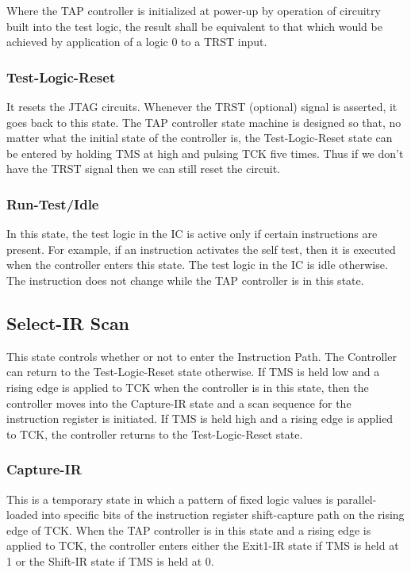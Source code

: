 Where the TAP controller is initialized at power-up by operation of circuitry built into the test logic, the result shall be equivalent to that which would be achieved by application of a logic 0 to a TRST input.

\subsubsection{Test-Logic-Reset}
\label{subsubsec:test-logic-reset}
It resets the JTAG circuits. Whenever the TRST (optional) signal is asserted, it goes back to this state. The TAP controller state machine is designed so that, no matter what the initial state of the controller is, the Test-Logic-Reset state can be entered by holding TMS at high and pulsing TCK five times. Thus if we don’t have the TRST signal then we can still reset the circuit.

\subsubsection{Run-Test/Idle}
\label{subsubsec:run-test-idle}
In this state, the test logic in the IC is active only if certain instructions are present. For example, if an instruction activates the self test, then it is executed when the controller enters this state. The test logic in the IC is idle otherwise. The instruction does not change while the TAP controller is in this state.

\subsection{Select-IR Scan}
\label{subsec:select-ir}
This state controls whether or not to enter the Instruction Path. The Controller can return to the Test-Logic-Reset state otherwise. If TMS is held low and a rising edge is applied to TCK when the controller is in this state, then the controller moves into the Capture-IR state and a scan sequence for the instruction register is initiated. If TMS is held high and a rising edge is applied to TCK, the controller returns to the Test-Logic-Reset state.

\subsubsection{Capture-IR}
\label{subsubsec:capture-ir}
This is a temporary state in which a pattern of fixed logic values is parallel-loaded into specific bits of the instruction register shift-capture path on the rising edge of TCK. When the TAP controller is in this state and a rising edge is applied to TCK, the controller enters either the Exit1-IR state if TMS is held at 1 or the Shift-IR state if TMS is held at 0.

